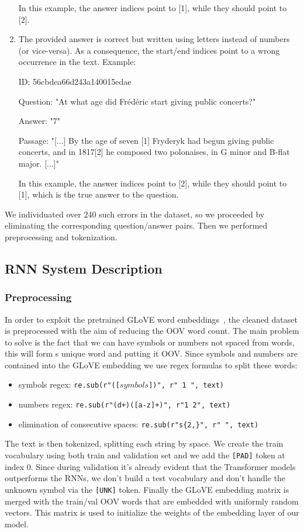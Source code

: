 \documentclass{article}
\newcommand{\code}[1]{\colorbox{light-gray}{\texttt{#1}}}
\begin{document}
\begin{enumerate}
    
    In this example, the answer indices point to [1], while they should point to [2].
    
    \item The provided answer is correct but written using letters instead of numbers (or vice-versa). As a consequence, the start/end indices point to a wrong occurrence in the text. Example:
    
    ID: 56cbdea66d243a140015edae
    
    Question: "At what age did Frédéric start giving public concerts?"

    Answer: "7"
    
    Passage: "[...] By the age of seven [1] Fryderyk had begun giving public concerts, and in 1817[2] he composed two polonaises, in G minor and B-flat major. [...]"
    
    In this example, the answer indices point to [2], while they should point to [1], which is the true answer to the question.
\end{enumerate}

We individuated over 240 such errors in the dataset, so we proceeded by eliminating the corresponding question/answer pairs. Then we performed preprocessing and tokenization.

\subsection{RNN System Description}
\subsubsection{Preprocessing}\label{preprocessing_for_RNN}
In order to exploit the pretrained GLoVE word embeddings~\cite{pennington2014glove}, the cleaned dataset is preprocessed with the aim of reducing the OOV word count.
The main problem to solve is the fact that we can have symbols or numbers not spaced from words, this will form s unique word and putting it OOV. Since symbols and numbers are contained into the GLoVE embedding we use regex formulas to split these words:
\begin{itemize}
    \item symbols regex:
    \code{re.sub(r"([$symbols$])", r" 1 ", text)}
    
    \item numbers regex:
    \code{re.sub(r"(d+)([a-z]+)", r"\symbol{92}1 \symbol{92}2", text)}
    
    \item elimination of consecutive spaces:
    \code{re.sub(r"s\{2,\}", r" ", text)}
\end{itemize}
The text is then tokenized, splitting each string by space. 
We create the train vocabulary using both train and validation set and we add the \code{[PAD]} token at index 0. Since during validation it's already evident that the Transformer models outperforms the RNNs, we don't build a test vocabulary and don't handle the unknown symbol via the \code{[UNK]} token.
Finally the GLoVE embedding matrix is merged with the train/val OOV words that are embedded with uniformly random vectors.
This matrix is used to initialize the weights of the embedding layer of our model.
\end{document}
